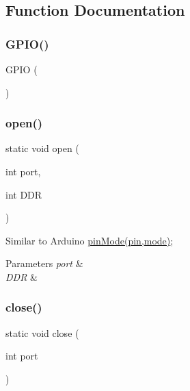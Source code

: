 \subsection{Function Documentation}
\mbox{\label{group__Porting__GPIO_ga872483872ed4d11f46192619106a188c}} 
\subsubsection{\texorpdfstring{G\+P\+I\+O()}{GPIO()}}
{\footnotesize\ttfamily G\+P\+IO (\begin{DoxyParamCaption}{ }\end{DoxyParamCaption})}

\mbox{\label{group__Porting__GPIO_gad3451cca241dbbf42bf381129385a35c}} 
\subsubsection{\texorpdfstring{open()}{open()}}
{\footnotesize\ttfamily static void open (\begin{DoxyParamCaption}\item[{int}]{port,  }\item[{int}]{D\+DR }\end{DoxyParamCaption})\hspace{0.3cm}{\ttfamily [static]}}

Similar to Arduino \hyperlink{group__Porting__General_ga361649efb4f1e2fa3c870ca203497d5e}{pin\+Mode(pin,mode)}; 
\begin{DoxyParams}{Parameters}
{\em port} & \\
\hline
{\em D\+DR} & \\
\hline
\end{DoxyParams}
\mbox{\label{group__Porting__GPIO_ga1b8cf31be61995207728f653ec11421f}} 
\subsubsection{\texorpdfstring{close()}{close()}}
{\footnotesize\ttfamily static void close (\begin{DoxyParamCaption}\item[{int}]{port }\end{DoxyParamCaption})\hspace{0.3cm}{\ttfamily [static]}}



